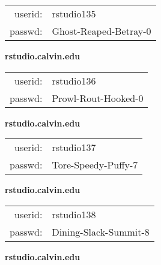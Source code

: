 \documentclass{article}\usepackage[]{graphicx}\usepackage[]{color}
\begin{document}
\begin{multicols}{3}
\begin{minipage}{.3\textwidth}
\begin{tabular}{rl}
userid: & rstudio135\\
passwd: & Ghost-Reaped-Betray-0

\vspace{5mm}

\end{tabular}\end{minipage}

\vspace{5mm}

\begin{minipage}{.3\textwidth}
\centerline{\textbf{rstudio.calvin.edu}}
\medskip
\begin{tabular}{rl}

userid: & rstudio136\\
passwd: & Prowl-Rout-Hooked-0

\vspace{5mm}

\end{tabular}\end{minipage}

\vspace{5mm}

\begin{minipage}{.3\textwidth}
\centerline{\textbf{rstudio.calvin.edu}}
\medskip
\begin{tabular}{rl}

userid: & rstudio137\\
passwd: & Tore-Speedy-Puffy-7

\vspace{5mm}

\end{tabular}\end{minipage}

\vspace{5mm}

\begin{minipage}{.3\textwidth}
\centerline{\textbf{rstudio.calvin.edu}}
\medskip
\begin{tabular}{rl}

userid: & rstudio138\\
passwd: & Dining-Slack-Summit-8

\vspace{5mm}

\end{tabular}\end{minipage}

\vspace{5mm}

\begin{minipage}{.3\textwidth}
\centerline{\textbf{rstudio.calvin.edu}}
\medskip
\begin{tabular}{rl}


\end{tabular}
\end{minipage}
\end{multicols}
\end{document}
